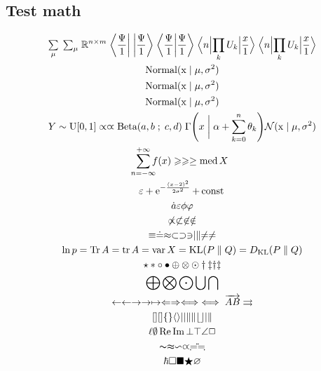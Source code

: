 \documentclass[a4paper,11pt]{article}
\begin{document}
  \subsection*{Test math}
    \begin{gather*}
      {\textstyle \underset{\mu}{\sum} \; \sum_{\mu}} \; \R^{n\times m}\; \bra{\frac{\Psi}{1}} \; \ket{\frac{\Psi}{1}} \;
      \braket{\frac{\Psi}{1}} \;
      \matrixelement{n}{\prod_k U_k}{\frac{x}{1}} \;
      \mel{n}{\prod_k U_k}{\frac{x}{1}} \\
      \text{Normal}(\mathrm{x} \mid \mu, \sigma^2 ) \\
      \textnormal{Normal}(\mathrm{x} \mid \mu, \sigma^2 ) \\
      \mathrm{Normal}(\mathrm{x} \mid \mu, \sigma^2 ) \\
      Y \sim \text{U}[0,1] \propto \varpropto \text{Beta}(a,b\;;\;c,d) \;
      \Gamma \p{x \mathrel{\bigg |} \alpha + \sum_{k=0}^n \theta_k}
      \mathcal{N}(\mathrm{x} \mid \mu, \sigma^2 ) \\
      \sum_{\mathclap{n=-\infty}}^{+\infty} f(x) \geqslant \geq \ge \med X \\
      \eps + \e^{-\frac{(x-2)^2}{2\sigma ^2}} + \const{} \\
      \dot{a} \epsilon \phi \varphi \\
      \not\propto \not\subset \not\in \notin \\
      \equiv \doteq \approx \subset \supset \ni \mid \parallel \neq \ne \\
      \ln p = \Tr A = \tr A = \var X = \KL\p{P \parallel Q} = \DKL\p{P \parallel Q} \\
      \star \ast \circ \bullet \oplus \otimes \odot \dagger \ddagger \text{\dag \ddag} \\
      \bigoplus \bigotimes \bigodot \bigcup \bigcap \\
      \leftarrow \gets \rightarrow \to \mapsto
      \Leftarrow \Rightarrow \Longleftrightarrow \iff \overrightarrow{AB} \rightrightarrows \\
      []\lbrack \rbrack \lbrace \rbrace \langle \rangle
      | \vert \| \Vert \lfloor \rfloor \arrowvert \Arrowvert \\
      \ell \emptyset \Re \Im \bot \top \angle \Box \\
      \thicksim \thickapprox \backsim \varpropto \risingdotseq \fallingdotseq \\
      \hbar \square \blacksquare \bigstar \varnothing
    \end{gather*}
\end{document}

